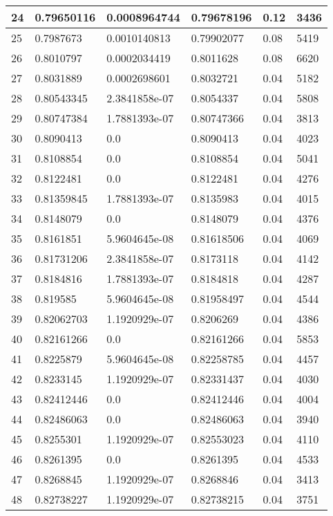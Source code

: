 \begin{longtable}{|l|l|l|l|l|l|}
24 & 0.79650116 & 0.0008964744 & 0.79678196 & 0.12 & 3436 \\ \hline 
25 & 0.7987673 & 0.0010140813 & 0.79902077 & 0.08 & 5419 \\ \hline 
26 & 0.8010797 & 0.0002034419 & 0.8011628 & 0.08 & 6620 \\ \hline 
27 & 0.8031889 & 0.0002698601 & 0.8032721 & 0.04 & 5182 \\ \hline 
28 & 0.80543345 & 2.3841858e-07 & 0.8054337 & 0.04 & 5808 \\ \hline 
29 & 0.80747384 & 1.7881393e-07 & 0.80747366 & 0.04 & 3813 \\ \hline 
30 & 0.8090413 & 0.0 & 0.8090413 & 0.04 & 4023 \\ \hline 
31 & 0.8108854 & 0.0 & 0.8108854 & 0.04 & 5041 \\ \hline 
32 & 0.8122481 & 0.0 & 0.8122481 & 0.04 & 4276 \\ \hline 
33 & 0.81359845 & 1.7881393e-07 & 0.8135983 & 0.04 & 4015 \\ \hline 
34 & 0.8148079 & 0.0 & 0.8148079 & 0.04 & 4376 \\ \hline 
35 & 0.8161851 & 5.9604645e-08 & 0.81618506 & 0.04 & 4069 \\ \hline 
36 & 0.81731206 & 2.3841858e-07 & 0.8173118 & 0.04 & 4142 \\ \hline 
37 & 0.8184816 & 1.7881393e-07 & 0.8184818 & 0.04 & 4287 \\ \hline 
38 & 0.819585 & 5.9604645e-08 & 0.81958497 & 0.04 & 4544 \\ \hline 
39 & 0.82062703 & 1.1920929e-07 & 0.8206269 & 0.04 & 4386 \\ \hline 
40 & 0.82161266 & 0.0 & 0.82161266 & 0.04 & 5853 \\ \hline 
41 & 0.8225879 & 5.9604645e-08 & 0.82258785 & 0.04 & 4457 \\ \hline 
42 & 0.8233145 & 1.1920929e-07 & 0.82331437 & 0.04 & 4030 \\ \hline 
43 & 0.82412446 & 0.0 & 0.82412446 & 0.04 & 4004 \\ \hline 
44 & 0.82486063 & 0.0 & 0.82486063 & 0.04 & 3940 \\ \hline 
45 & 0.8255301 & 1.1920929e-07 & 0.82553023 & 0.04 & 4110 \\ \hline 
46 & 0.8261395 & 0.0 & 0.8261395 & 0.04 & 4533 \\ \hline 
47 & 0.8268845 & 1.1920929e-07 & 0.8268846 & 0.04 & 3413 \\ \hline 
48 & 0.82738227 & 1.1920929e-07 & 0.82738215 & 0.04 & 3751 \\ \hline 

\end{longtable}
